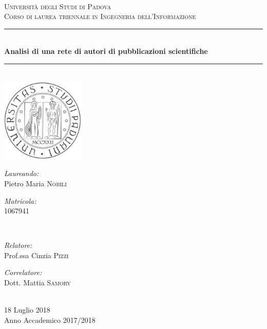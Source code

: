 \documentclass[12pt,a4paper,twoside]{report}
\begin{document}
\begin{titlepage}



\center  %

\textsc{\Large \\[4.5cm]Università degli Studi di Padova}\\[1.5cm]
\textsc{\Large Corso di laurea triennale in Ingegneria dell'Informazione}\\[0.5cm]

\noindent\rule{\textwidth}{0.6pt}\\[0.4cm]
{ \Large{\bfseries Analisi di una rete di autori di pubblicazioni scientifiche}}\\[0.4cm]
\noindent\rule{\textwidth}{0.6pt}\\[1cm]

\includegraphics[height=4cm]{img/unipd-bn}\\[1cm]


\begin{minipage}{0.4\textwidth}
\begin{flushleft} \large
\emph{Laureando:}\\
Pietro Maria \textsc{Nobili} %
\end{flushleft}
\begin{flushleft} \large
\emph{Matricola:}\\
1067941 %
\end{flushleft}
\end{minipage}
~
\begin{minipage}{0.5\textwidth}
\begin{flushright} \large
\emph{Relatore:} \\
Prof.ssa Cinzia \textsc{Pizzi} \\%
\end{flushright}
\begin{flushright} \large
\emph{Correlatore:} \\
Dott. Mattia \textsc{Samory} %
\end{flushright}
\end{minipage}\\[2cm]


{\large 18 Luglio 2018}\\
{\large Anno Accademico 2017/2018}\\[3cm] %


\vfill %

\end{titlepage}
\end{document}
